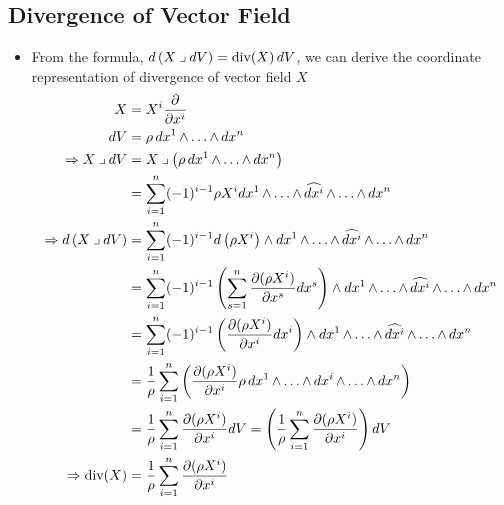 \documentclass[11pt]{article}
\begin{document}
\subsection{Divergence of Vector Field}
\begin{itemize}
\item From the formula, $d\left(X \mathbin{\lrcorner }{d}V\right) = \text{div}(X)\,dV$, we can derive the coordinate representation of divergence of vector field $X$
\begin{align*}
X &= X^i \frac{\partial }{ \partial x^i}\\
dV &= \rho\, dx^1 \,{\wedge}\ldots{\wedge}\, dx^n\\
\Rightarrow X \mathbin{\lrcorner }{d}V &= X \mathbin{\lrcorner }{\left( \rho\, dx^1 \,{\wedge}\ldots{\wedge}\, dx^n\right)} \\
&= \sum_{i=1}^{n}(-1)^{i-1}\rho X^i dx^1\,{\wedge}\ldots{\wedge}\, \widehat{dx^i} \,{\wedge}\ldots{\wedge}\, dx^n\\
\Rightarrow d\left(X \mathbin{\lrcorner }{d}V\right)&=  \sum_{i=1}^{n}(-1)^{i-1}d\left(\rho X^i\right) \wedge dx^1\,{\wedge}\ldots{\wedge}\, \widehat{dx^i} \,{\wedge}\ldots{\wedge}\, dx^n\\
&= \sum_{i=1}^{n}(-1)^{i-1}\left(\sum_{s=1}^{n}\frac{\partial (\rho X^i)}{ \partial x^s}dx^s\right) \wedge dx^1\,{\wedge}\ldots{\wedge}\, \widehat{dx^i} \,{\wedge}\ldots{\wedge}\, dx^n\\
&= \sum_{i=1}^{n}(-1)^{i-1}\left(\frac{\partial (\rho X^i)}{ \partial x^i}dx^i\right) \wedge dx^1\,{\wedge}\ldots{\wedge}\, \widehat{dx^i} \,{\wedge}\ldots{\wedge}\, dx^n\\
&=  \frac{1}{\rho}\sum_{i=1}^{n}\left(\frac{\partial (\rho X^i)}{ \partial x^i} \rho\,dx^1\,{\wedge}\ldots{\wedge}\, dx^i  \,{\wedge}\ldots{\wedge}\, dx^n\right)\\
&=  \frac{1}{\rho}\sum_{i=1}^{n}\frac{\partial (\rho X^i)}{ \partial x^i}  dV = \left(\frac{1}{\rho}\sum_{i=1}^{n} \frac{\partial (\rho X^i)}{ \partial x^i}\right)dV\\
\Rightarrow  \text{div}(X)&=\frac{1}{\rho} \sum_{i=1}^{n} \frac{\partial (\rho X^i)}{ \partial x^i}
\end{align*}
\end{itemize}

\newpage


\end{document}

